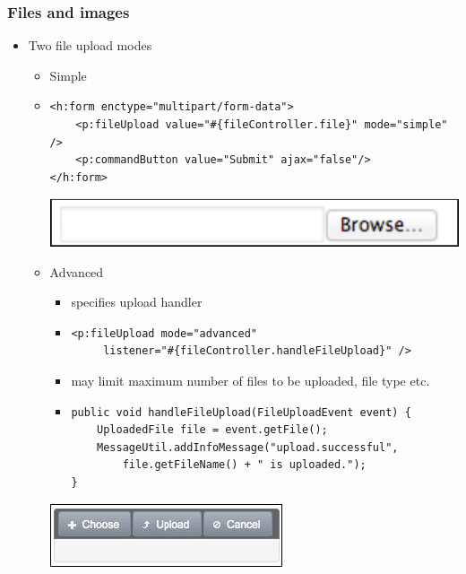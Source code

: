 \documentclass[10pt,xcolor=pdflatex]{beamer}
\begin{document}
\begin{frame}[containsverbatim]\frametitle{Files and images}
  \begin{itemize}
    \item Two file upload modes
	  \begin{itemize}
		\item Simple
        \item[] \begin{footnotesize} \begin{verbatim}
<h:form enctype="multipart/form-data">
    <p:fileUpload value="#{fileController.file}" mode="simple" />
    <p:commandButton value="Submit" ajax="false"/>
</h:form>        	
\end{verbatim} \end{footnotesize}
        \vspace{0.1cm}
        \includegraphics[scale=0.3]{img/obr1}
        \vspace{0.2cm}
    	\item Advanced
          \begin{itemize}
            \item {\footnotesize specifies upload handler}
            \item[] \begin{footnotesize} \begin{verbatim}
<p:fileUpload mode="advanced"
     listener="#{fileController.handleFileUpload}" />        	
\end{verbatim} \end{footnotesize}
            \item {\footnotesize may limit maximum number of files to be uploaded, file type etc.}
    	    \item[] \begin{footnotesize} \begin{verbatim}
public void handleFileUpload(FileUploadEvent event) {
    UploadedFile file = event.getFile();
    MessageUtil.addInfoMessage("upload.successful", 
        file.getFileName() + " is uploaded.");
}
\end{verbatim} \end{footnotesize}
          \end{itemize}
        \vspace{0.1cm}
        \includegraphics[scale=0.5]{img/obr2}

\end{itemize}
\end{itemize}
\end{frame}
\end{document}
